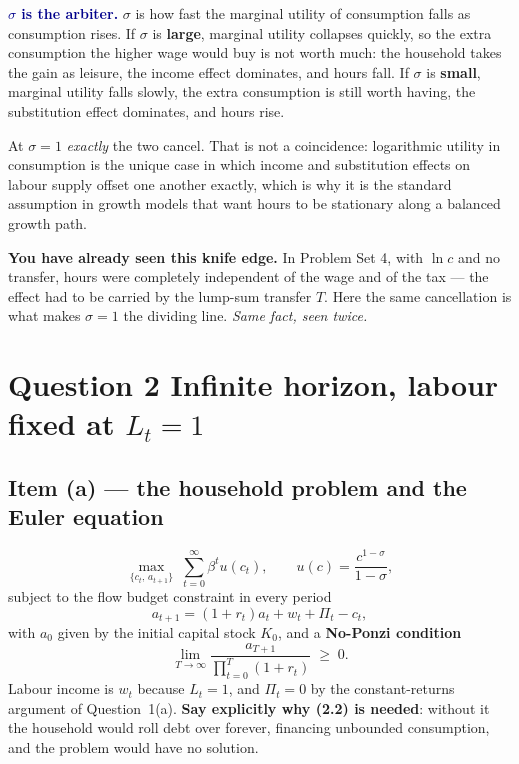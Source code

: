\documentclass[11pt, a4paper]{article}
\newcommand{\resp}[1]{%
  \ifmmode {\color{darkblue}#1}\else\textcolor{darkblue}{\textbf{#1}}\fi}
\begin{document}
\resp{$\sigma$ is the arbiter.} $\sigma$ is how fast the marginal utility of consumption
falls as consumption rises. If $\sigma$ is \textbf{large}, marginal utility collapses
quickly, so the extra consumption the higher wage would buy is not worth much: the
household takes the gain as leisure, the income effect dominates, and hours fall. If
$\sigma$ is \textbf{small}, marginal utility falls slowly, the extra consumption is still
worth having, the substitution effect dominates, and hours rise.

\begin{tcolorbox}[rubricbox]
\small
At $\sigma=1$ \emph{exactly} the two cancel. That is not a coincidence: logarithmic utility
in consumption is the unique case in which income and substitution effects on labour supply
offset one another exactly, which is why it is the standard assumption in growth models
that want hours to be stationary along a balanced growth path.

\smallskip
\textbf{You have already seen this knife edge.} In Problem Set 4, with $\ln c$ and no
transfer, hours were completely independent of the wage and of the tax --- the effect had to
be carried by the lump-sum transfer $T$. Here the same cancellation is what makes
$\sigma=1$ the dividing line. \emph{Same fact, seen twice.}
\end{tcolorbox}

\section{Question 2 \quad Infinite horizon, labour fixed at $L_t=1$}

\subsection*{Item (a) --- the household problem and the Euler equation}

\[
\max_{\{c_t,\,a_{t+1}\}}\;\sum_{t=0}^{\infty}\beta^t u(c_t),
\qquad u(c)=\frac{c^{1-\sigma}}{1-\sigma},
\]
subject to the flow budget constraint in every period
\[
a_{t+1}=(1+r_t)a_t+w_t+\Pi_t-c_t ,
\tag{2.1}
\]
with $a_0$ given by the initial capital stock $K_0$, and a \textbf{No-Ponzi condition}
\[
\lim_{T\to\infty}\frac{a_{T+1}}{\prod_{t=0}^{T}(1+r_t)}\;\ge\;0 .
\tag{2.2}
\]
Labour income is $w_t$ because $L_t=1$, and $\Pi_t=0$ by the constant-returns argument of
Question~1(a). \textbf{Say explicitly why (2.2) is needed}: without it the household would
roll debt over forever, financing unbounded consumption, and the problem would have no
solution.
\end{document}
